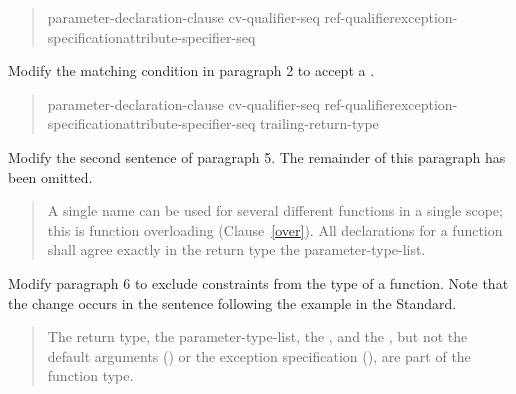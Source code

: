 \begin{quote}
\pnum
\begin{bnf}
 \terminal{(} parameter-declaration-clause \terminal{)} cv-qualifier-seq\opt\br
  \hspace*{\bnfindentinc}ref-qualifier\opt exception-specification\opt attribute-specifier-seq\opt\br
  \hspace*{\bnfindentinc}
\end{bnf}
\end{quote}

Modify the matching condition in paragraph 2 to accept a 
.

\begin{quote}
\pnum
\begin{bnf}
 \terminal{(} parameter-declaration-clause \terminal{)} cv-qualifier-seq\opt\br 
  \hspace*{\bnfindentinc}ref-qualifier\opt exception-specification\opt attribute-specifier-seq\opt\br
  \hspace*{\bnfindentinc}trailing-return-type 
\end{bnf}
\end{quote}


Modify the second sentence of paragraph 5. The remainder of this
paragraph has been omitted.

\begin{quote}
\setcounter{Paras}{4}
\pnum
A single name can be used for several different functions in a single 
scope; this is function overloading (Clause~\ref{over}). 
%
All declarations for a function shall agree exactly in  
the return type\added{,}  the parameter-type-list.
\end{quote}

Modify paragraph 6 to exclude constraints from the type of a function.
Note that the change occurs in the sentence following the example
in the \Cpp Standard.

\begin{quote}
\pnum
The return type, the parameter-type-list, the , 
and the , but not the default arguments
() or
the exception specification (), are part of the function 
type.
\end{quote}


